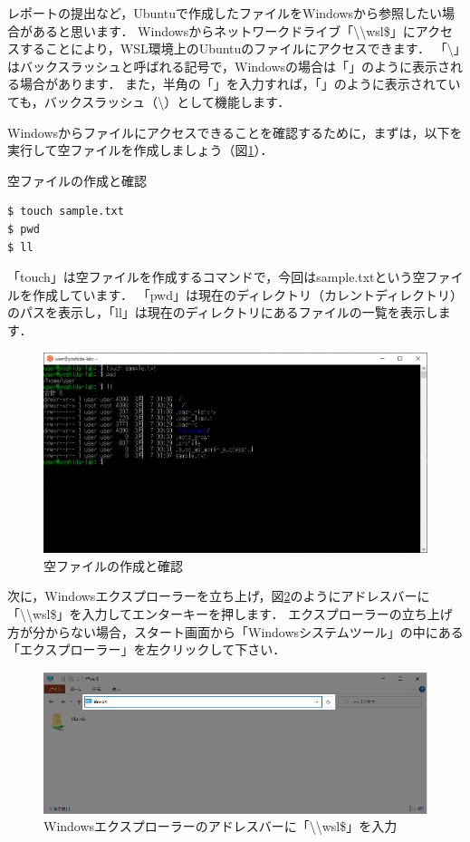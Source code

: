 \documentclass[dvipdfmx]{jarticle}
\begin{document}
レポートの提出など，Ubuntuで作成したファイルをWindowsから参照したい場合があると思います．
Windowsからネットワークドライブ「\textbackslash\textbackslash{wsl}\$」にアクセスすることにより，WSL環境上のUbuntuのファイルにアクセスできます．
「\textbackslash」はバックスラッシュと呼ばれる記号で，Windowsの場合は「\textyen」のように表示される場合があります．
また，半角の「\textyen」を入力すれば，「\textyen」のように表示されていても，バックスラッシュ（\textbackslash）として機能します．

Windowsからファイルにアクセスできることを確認するために，まずは，以下を実行して空ファイルを作成しましょう（図\ref{fig:pwd}）．
\begin{itembox}[l]{空ファイルの作成と確認}
\begin{verbatim}
$ touch sample.txt
$ pwd
$ ll
\end{verbatim}
\end{itembox}
「touch」は空ファイルを作成するコマンドで，今回はsample.txtという空ファイルを作成しています．
「pwd」は現在のディレクトリ（カレントディレクトリ）のパスを表示し，「ll」は現在のディレクトリにあるファイルの一覧を表示します．

\begin{figure}[h]
  \centering
  \includegraphics[width=0.95\linewidth]{figures/UbuntuPwd.png}
  \caption{空ファイルの作成と確認}
  \label{fig:pwd}
\end{figure}

次に，Windowsエクスプローラーを立ち上げ，図\ref{fig:explorer1}のようにアドレスバーに「\textbackslash\textbackslash{wsl}\$」を入力してエンターキーを押します．
エクスプローラーの立ち上げ方が分からない場合，スタート画面から「Windowsシステムツール」の中にある「エクスプローラー」を左クリックして下さい．

\begin{figure}[h]
  \centering
  \includegraphics[width=0.95\linewidth]{figures/explorer1.eps}
  \caption{Windowsエクスプローラーのアドレスバーに「\textbackslash\textbackslash{wsl}\$」を入力}
  \label{fig:explorer1}
\end{figure}
\end{document}
